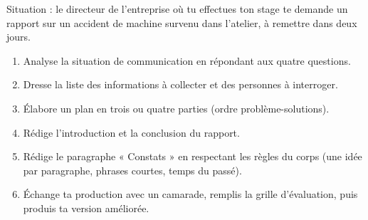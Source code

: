 \documentclass[11pt]{article}
\begin{document}
\begin{exercice}
Situation : le directeur de l'entreprise où tu effectues ton stage te demande un rapport sur un accident de machine survenu dans l'atelier, à remettre dans deux jours.
\begin{enumerate}
\item Analyse la situation de communication en répondant aux quatre questions.
\item Dresse la liste des informations à collecter et des personnes à interroger.
\item Élabore un plan en trois ou quatre parties (ordre problème-solutions).
\item Rédige l'introduction et la conclusion du rapport.
\item Rédige le paragraphe « Constats » en respectant les règles du corps (une idée par paragraphe, phrases courtes, temps du passé).
\item Échange ta production avec un camarade, remplis la grille d'évaluation, puis produis ta version améliorée.
\end{enumerate}
\end{exercice}
\end{document}
